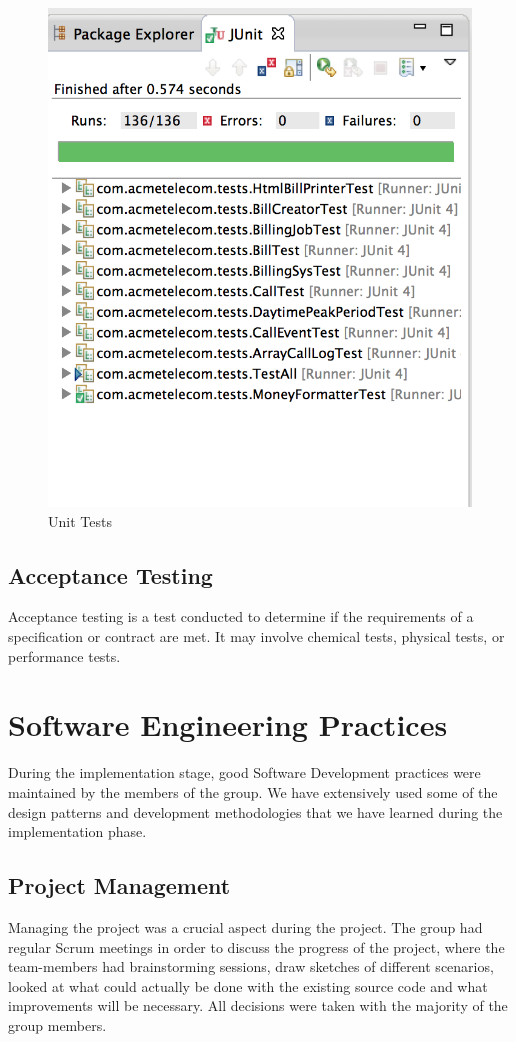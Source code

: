 \documentclass[11pt,twocolumn]{article} %
\begin{document}
\begin{figure}[!ht]
\centering
\includegraphics[scale=0.40]{cod_pro_analytix.png}
\caption{Unit Tests}
\end{figure}

\subsection{Acceptance Testing}
Acceptance testing is a test conducted to determine if the requirements of a specification or contract are met. 
It may involve chemical tests, physical tests, or performance tests.

\section{Software Engineering Practices}
During the implementation stage, good Software Development practices were maintained by the members of the group. We have extensively used some of the design patterns and development methodologies that we have learned during the implementation phase.

\subsection{Project Management}
Managing the project was a crucial aspect during the project. The group had regular Scrum meetings in order to discuss the 
progress of the project, where the team-members had brainstorming sessions, draw sketches of different scenarios, looked at
what could actually be done with the existing source code and what improvements will be necessary. All decisions were taken
with the majority of the group members.
\end{document}
